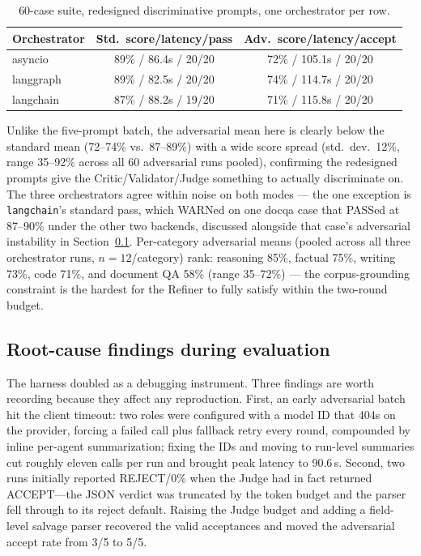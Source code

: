 \documentclass{article}
\begin{document}
\begin{table}[t]
\centering
\caption{60-case suite, redesigned discriminative prompts, one orchestrator per row.}
\label{tab:sixtycase}
\begin{tabular}{@{}lcc@{}}
\toprule
Orchestrator & Std.\ score/latency/pass & Adv.\ score/latency/accept \\
\midrule
asyncio   & 89\% / 86.4s / 20\slash20 & 72\% / 105.1s / 20\slash20 \\
langgraph & 89\% / 82.5s / 20\slash20 & 74\% / 114.7s / 20\slash20 \\
langchain & 87\% / 88.2s / 19\slash20 & 71\% / 115.8s / 20\slash20 \\
\bottomrule
\end{tabular}
\end{table}

Unlike the five-prompt batch, the adversarial mean here is clearly below the standard mean
(72--74\% vs.\ 87--89\%) with a wide score spread (std.\ dev.\ 12\%, range 35--92\% across all
60 adversarial runs pooled), confirming the redesigned prompts give the Critic/Validator/Judge
something to actually discriminate on. The three orchestrators agree within noise on both
modes --- the one exception is \texttt{langchain}'s standard pass, which WARNed on one docqa
case that PASSed at 87--90\% under the other two backends, discussed alongside that case's
adversarial instability in Section~\ref{sec:findings}. Per-category adversarial means (pooled
across all three orchestrator runs, $n=12$/category) rank: reasoning 85\%, factual 75\%,
writing 73\%, code 71\%, and document QA 58\% (range 35--72\%) --- the corpus-grounding
constraint is the hardest for the Refiner to fully satisfy within the two-round budget.

\subsection{Root-cause findings during evaluation}
\label{sec:findings}
The harness doubled as a debugging instrument. Three findings are worth recording because they
affect any reproduction. First, an early adversarial batch hit the client timeout: two roles
were configured with a model ID that 404s on the provider, forcing a failed call plus fallback
retry every round, compounded by inline per-agent summarization; fixing the IDs and moving to
run-level summaries cut roughly eleven calls per run and brought peak latency to 90.6\,s.
Second, two runs initially reported REJECT/0\% when the Judge had in fact returned ACCEPT---the
JSON verdict was truncated by the token budget and the parser fell through to its reject
default. Raising the Judge budget and adding a field-level salvage parser recovered the valid
acceptances and moved the adversarial accept rate from 3/5 to 5/5.
\end{document}
